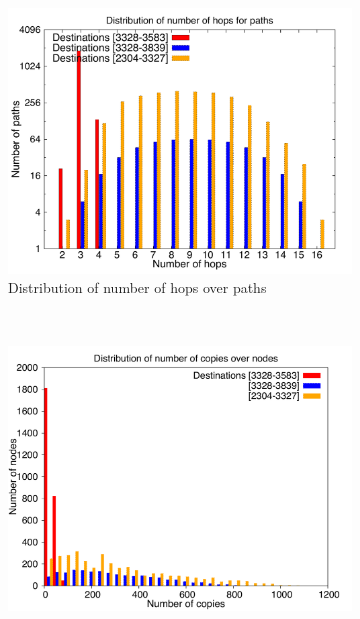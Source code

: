 \begin{figure}[!htbp]
        \centering
        \begin{subfigure}[b]{0.49\textwidth}
                \includegraphics[width=\textwidth]{report_figures/incrsize/4k/hop_histo.pdf}
                \caption{Distribution of number of hops over paths}
                \label{fig:incrsize_4k_hop}
        \end{subfigure}%
        ~ %
        \begin{subfigure}[b]{0.49\textwidth}
                \includegraphics[width=\textwidth]{report_figures/incrsize/4k/copy_histo.pdf}

\end{subfigure}
\end{figure}
